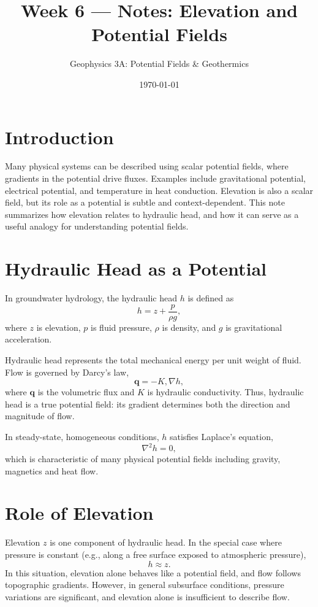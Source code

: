 \documentclass[11pt]{article}
\title{Week 6 --- Notes: Elevation and Potential Fields}
\author{Geophysics 3A: Potential Fields \& Geothermics}
\date{\today}
\begin{document}
\maketitle

\section{Introduction}

Many physical systems can be described using scalar potential fields, where gradients in the potential drive fluxes. Examples include gravitational potential, electrical potential, and temperature in heat conduction. Elevation is also a scalar field, but its role as a potential is subtle and context-dependent. This note summarizes how elevation relates to hydraulic head, and how it can serve as a useful analogy for understanding potential fields.

\section{Hydraulic Head as a Potential}

In groundwater hydrology, the hydraulic head $h$ is defined as
\begin{equation}
h = z + \frac{p}{\rho g},
\end{equation}
where $z$ is elevation, $p$ is fluid pressure, $\rho$ is density, and $g$ is gravitational acceleration.

Hydraulic head represents the total mechanical energy per unit weight of fluid. Flow is governed by Darcy's law,
\begin{equation}
\mathbf{q} = -K , \nabla h,
\end{equation}
where $\mathbf{q}$ is the volumetric flux and $K$ is hydraulic conductivity. Thus, hydraulic head is a true potential field: its gradient determines both the direction and magnitude of flow.

In steady-state, homogeneous conditions, $h$ satisfies Laplace's equation,
\begin{equation}
\nabla^2 h = 0,
\end{equation}
which is characteristic of many physical potential fields including gravity, magnetics and heat flow.

\section{Role of Elevation}

Elevation $z$ is one component of hydraulic head. In the special case where pressure is constant (e.g., along a free surface exposed to atmospheric pressure),
\begin{equation}
h \approx z.
\end{equation}
In this situation, elevation alone behaves like a potential field, and flow follows topographic gradients. However, in general subsurface conditions, pressure variations are significant, and elevation alone is insufficient to describe flow.
\end{document}
